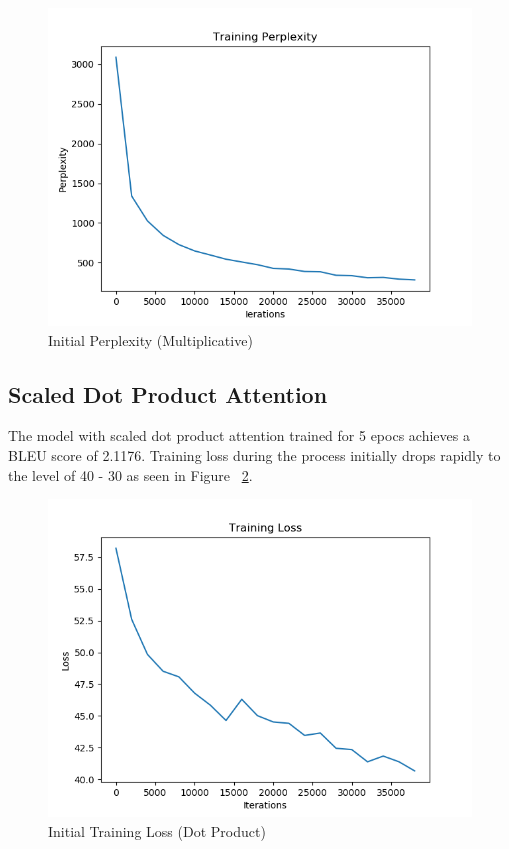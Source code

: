 \documentclass[11pt,a4paper]{article}
\begin{document}
\begin{figure}[!htbp]
\includegraphics[width=\linewidth]{hi_mul_ppl_1.png}
\caption{Initial Perplexity (Multiplicative)}
\label{fig3}
\end{figure}


\subsection{Scaled Dot Product Attention}
The model with scaled dot product attention trained for 5 epocs achieves a BLEU score of 2.1176.
Training loss during the process initially drops rapidly to the level of 40 - 30 as seen in Figure ~\ref{fig5}.

\begin{figure}[!htbp]
\includegraphics[width=\linewidth]{hi_dot_loss_1.png}
\caption{Initial Training Loss (Dot Product)}
\label{fig5}
\end{figure}
\end{document}
